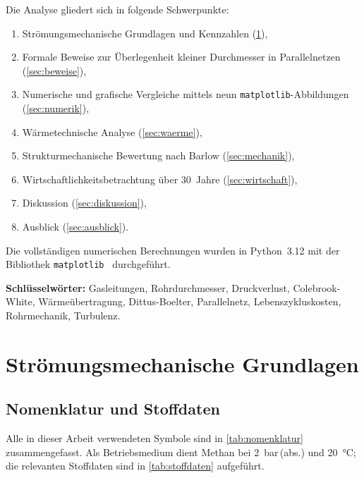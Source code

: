 ﻿\documentclass[12pt,a4paper,twoside]{article}
\theoremstyle{plain}
\theoremstyle{definition}
\theoremstyle{remark}
\begin{document}
Die Analyse gliedert sich in folgende Schwerpunkte:
\begin{enumerate}[label=(\roman*)]
  \item Strömungsmechanische Grundlagen und Kennzahlen (\cref{sec:grundlagen}),
  \item Formale Beweise zur Überlegenheit kleiner Durchmesser in Parallelnetzen
        (\cref{sec:beweise}),
  \item Numerische und grafische Vergleiche mittels neun \texttt{matplotlib}-Abbildungen
        (\cref{sec:numerik}),
  \item Wärmetechnische Analyse (\cref{sec:waerme}),
  \item Strukturmechanische Bewertung nach Barlow (\cref{sec:mechanik}),
  \item Wirtschaftlichkeitsbetrachtung über 30~Jahre (\cref{sec:wirtschaft}),
  \item Diskussion (\cref{sec:diskussion}),
  \item Ausblick (\cref{sec:ausblick}).
\end{enumerate}

\bigskip
\noindent
Die vollständigen numerischen Berechnungen wurden in Python~3.12 mit der
Bibliothek \texttt{matplotlib}~\cite{Hunter2007} durchgeführt.

\noindent\textbf{Schlüsselwörter:} Gasleitungen, Rohrdurchmesser, Druckverlust, Colebrook-White, Wärmeübertragung, Dittus-Boelter, Parallelnetz, Lebenszykluskosten, Rohrmechanik, Turbulenz.


\section{Strömungsmechanische Grundlagen}
\label{sec:grundlagen}

\subsection{Nomenklatur und Stoffdaten}
\label{ssec:nomenklatur}

Alle in dieser Arbeit verwendeten Symbole sind in \cref{tab:nomenklatur}
zusammengefasst.
Als Betriebsmedium dient Methan bei \SI{2}{\bar}\,(abs.) und \SI{20}{\celsius};
die relevanten Stoffdaten sind in \cref{tab:stoffdaten} aufgeführt.
\end{document}
